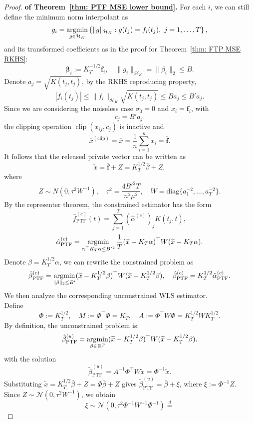 \begin{proof}\textbf{of Theorem~\ref{thm: PTF MSE lower bound}.}
For each $i$, we can still define the minimum norm interpolant as
\[
g_i
=
\operatorname*{argmin}_{g\in\mathcal H_K}
\left\{
\|g\|_{\mathcal H_K}:
g(t_j)=f_i(t_j),\ j=1,\ldots,T
\right\},
\]
and its transformed coefficients as in the proof for Theorem~\ref{thm: FTP MSE RKHS}:
\[
\mathbf \beta_i
:=
K_T^{-1/2}\mathbf f_i,\quad
\|g_i\|_{\mathcal H_K} = \|\beta_i\|_2\le B.
\]
Denote $a_j = \sqrt{K(t_j,t_j)}$, by the RKHS reproducing property, 
\[
|f_i(t_j)|
\leq
\|f_i\|_{\mathcal{H}_K}\sqrt{K(t_j,t_j)}
\leq
Ba_j
\leq 
B' a_j.
\]
Since we are considering the noiseless case $\sigma_0=0$ and $x_i = \mathbf{f}_i$, with
\[
c_j = B'a_j.
\]
the clipping operation $\operatorname{clip}(x_{ij},c_j)$ is inactive and
\[
\bar x^{(\mathrm{clip})}
=
\bar{x}
=
\dfrac{1}{n}\sum_{i=1}^n x_i
=
\bar{\mathbf{f}}.
\]
It follows that the released private vector can be written as
\[
\widetilde x
=
\bar{\mathbf{f}}+Z
=
K_T^{1/2}\bar{\beta} + Z
,
\]
where
\[
Z\sim N(0,\tau^2W^{-1}),
\quad
\tau^2=\frac{4B'^2T}{n^2\mu^2},
\quad
W = \mathrm{diag}\{a_1^{-2},\ldots,a_T^{-2}\}.
\]
By the representer theorem, the constrained estimator has the form
\[
\hat f_{\mathrm{PTF}}^{(c)}(t)
=
\sum_{j=1}^T
(\hat\alpha^{(c)})_jK(t_j,t),
\]
\[
\hat\alpha_{\mathrm{PTF}}^{(c)}
=
\operatorname*{argmin}_{\alpha^\top K_T\alpha\le {B'}^2}
\dfrac{1}{T} 
(\widetilde{x} - K_T\alpha)^\top W (\widetilde{x} - K_T\alpha).
\]
Denote $\beta = K_T^{1/2}\alpha$, we can rewrite the constrained problem as
\[
\hat\beta_{\mathrm{PTF}}^{(c)}
=
\operatorname*{argmin}_{\|\beta\|_2\le B'}
(\widetilde{x} - K_T^{1/2}\beta)^\top W (\widetilde{x} - K_T^{1/2}\beta),
\quad 
\hat\beta_{\mathrm{PTF}}^{(c)} = K_T^{1/2}\hat\alpha_{\mathrm{PTF}}^{(c)}.
\]
We then analyze the corresponding unconstrained WLS estimator.\\
Define 
\[
\Phi:=K_T^{1/2},
\quad
M:=\Phi^\top\Phi = K_T,
\quad
A:= \Phi^\top W\Phi
=K_T^{1/2}WK_T^{1/2}.
\]
By
definition, the unconstrained problem is:
\[
\hat{\beta}_{\mathrm{PTF}}^{(u)}
=
\operatorname*{argmin}_{\beta\in \,{\mathbb{R}} ^T} (\widetilde{x} - K_T^{1/2}\beta)^\top W (\widetilde{x} - K_T^{1/2}\beta).
\]
with the solution
\[
\widetilde\beta_{\mathrm{PTF}}^{(u)}
=
A^{-1}\Phi^\top W\widetilde x
=
\Phi^{-1}\widetilde{x}.
\]
Substituting 
$\widetilde x=K_T^{1/2}\bar{\beta} + Z= \Phi\bar\beta + Z$ gives $\widetilde\beta_{\mathrm{PTF}}^{(u)}=\bar\beta+\xi$, where $\xi:=\Phi^{-1}Z$.\\
Since $Z\sim \mathcal{N}(0,\tau^2W^{-1})$, we obtain
\[
\xi
\sim
\mathcal{N} (0,\tau^2 \Phi^{-1}W^{-1}\Phi^{-1})
\overset{d}{=}
\]
\end{proof}
